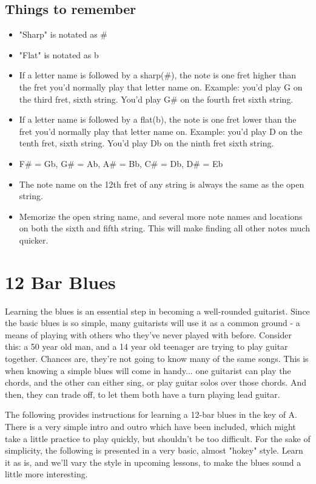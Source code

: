 \subsection{Things to remember}
\begin{itemize}
\item "Sharp" is notated as \#
\item "Flat" is notated as b
\item If a letter name is followed by a sharp(\#), the note is one fret higher than the fret you'd normally play that letter name on. Example: you'd play G on the third fret, sixth string. You'd play G\# on the fourth fret sixth string.
\item If a letter name is followed by a flat(b), the note is one fret lower than the fret you'd normally play that letter name on. Example: you'd play D on the tenth fret, sixth string. You'd play Db on the ninth fret sixth string.
\item F\# = Gb, G\# = Ab, A\# = Bb, C\# = Db, D\# = Eb
\item The note name on the 12th fret of any string is always the same as the open string.
\item Memorize the open string name, and several more note names and locations on both the sixth and fifth string. This will make finding all other notes much quicker. 
\end{itemize}

\section{12 Bar Blues}
Learning the blues is an essential step in becoming a well-rounded guitarist. Since the basic blues is so simple, many guitarists will use it as a common ground - a means of playing with others who they've never played with before. Consider this: a 50 year old man, and a 14 year old teenager are trying to play guitar together. Chances are, they're not going to know many of the same songs. This is when knowing a simple blues will come in handy... one guitarist can play the chords, and the other can either sing, or play guitar solos over those chords. And then, they can trade off, to let them both have a turn playing lead guitar.

The following provides instructions for learning a 12-bar blues in the key of A. There is a very simple intro and outro which have been included, which might take a little practice to play quickly, but shouldn't be too difficult. For the sake of simplicity, the following is presented in a very basic, almost "hokey" style. Learn it as is, and we'll vary the style in upcoming lessons, to make the blues sound a little more interesting. 

